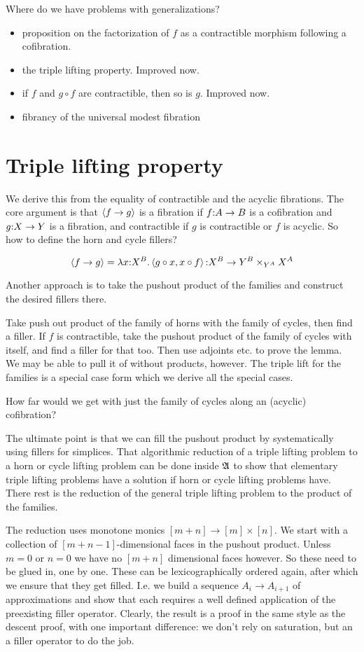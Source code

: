 \documentclass[csh.tex]{subfiles}
\begin{document}
Where do we have problems with generalizations?
\begin{itemize}
\item proposition on the factorization of $f$ as a contractible morphism following a cofibration.
\item the triple lifting property. Improved now.
\item if $f$ and $g\circ f$ are contractible, then so is $g$. Improved now.
\item fibrancy of the universal modest fibration
\end{itemize}

\section{Triple lifting property}
We derive this from the equality of contractible and the acyclic fibrations. The core argument is that $\left\langle f\to g \right\rangle$ is a fibration if $f\mathord : A\to B$ is a cofibration and $g\mathord : X\to Y$ is a fibration, and contractible if $g$ is contractible or $f$ is acyclic. So how to define the horn and cycle fillers?

\[ \left\langle f\to g \right\rangle = \lambda x\mathord : X^B .\left\langle g\circ x,x\circ f \right\rangle\mathord : X^B \to Y^B\times_{Y^A} X^A \]

Another approach is to take the pushout product of the families and construct the desired fillers there.

Take push out product of the family of horns with the family of cycles, then find a filler.
If $f$ is contractible, take the pushout product of the family of cycles with itself, and find a filler for that too.
Then use adjoints etc. to prove the lemma.
We may be able to pull it of without products, however. The triple lift for the families is a special case form which we derive all the special cases.

How far would we get with just the family of cycles along an (acyclic) cofibration?

The ultimate point is that we can fill the pushout product by systematically using fillers for simplices.
That algorithmic reduction of a triple lifting problem to a horn or cycle lifting problem can be done inside $\mathfrak A$ to show that elementary triple lifting problems have a solution if horn or cycle lifting problems have. There rest is the reduction of the general triple lifting problem to the product of the families.

The reduction uses monotone monics $[m + n]\to[m]\times[n]$. 
We start with a collection of $[m+n-1]$-dimensional faces in the pushout product. Unless $m=0$ or $n=0$ we have no $[m+n]$ dimensional faces however. So these need to be glued in, one by one.
These can be lexicographically ordered again, after which we ensure that they get filled.
I.e. we build a sequence $A_i\to A_{i+1}$ of approximations and show that each requires a well defined application of the preexisting filler operator.
Clearly, the result is a proof in the same style as the descent proof, with one important difference: we don't rely on saturation, but an a filler operator to do the job.
\end{document}
